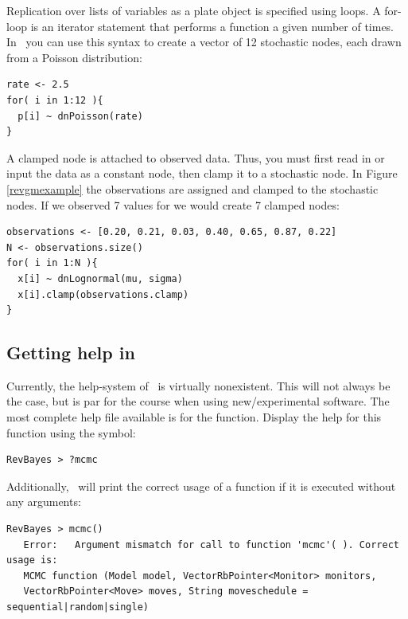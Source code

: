 Replication over lists of variables as a plate object is specified using  loops. 
A for-loop is an iterator statement that performs a function a given number of times. 
In \Rev~you can use this syntax to create a vector of 12 stochastic nodes, each drawn from a Poisson distribution:
{\tt \begin{snugshade*}
\begin{lstlisting}
rate <- 2.5
for( i in 1:12 ){
  p[i] ~ dnPoisson(rate)
}
\end{lstlisting}
\end{snugshade*}}

A clamped node is attached to observed data. 
Thus, you must first read in or input the data as a constant node, then clamp it to a stochastic node. 
In Figure \ref{revgmexample} the observations are assigned and clamped to the stochastic nodes.
If we observed 7 values for  we would create 7 clamped nodes:
{\tt \begin{snugshade*}
\begin{lstlisting}
observations <- [0.20, 0.21, 0.03, 0.40, 0.65, 0.87, 0.22]
N <- observations.size()
for( i in 1:N ){
  x[i] ~ dnLognormal(mu, sigma)
  x[i].clamp(observations.clamp)
}
\end{lstlisting}
\end{snugshade*}}



\subsection*{Getting help in \RevBayes}
%
%
%


Currently, the help-system of \RevBayes~is virtually nonexistent. 
This will not always be the case, but is par for the course when using new/experimental software. 
The most complete help file available is for the  function. Display the help for this function using the  symbol:
{\tt \begin{snugshade*}
\begin{lstlisting}
RevBayes > ?mcmc
\end{lstlisting}
\end{snugshade*}}

Additionally, \RevBayes~will print the correct usage of a function if it is executed without any arguments:
{\tt \small \begin{snugshade*}
\begin{lstlisting}
RevBayes > mcmc()
   Error:   Argument mismatch for call to function 'mcmc'( ). Correct usage is:
   MCMC function (Model model, VectorRbPointer<Monitor> monitors,
   VectorRbPointer<Move> moves, String moveschedule = sequential|random|single)
\end{lstlisting}
\end{snugshade*}}

